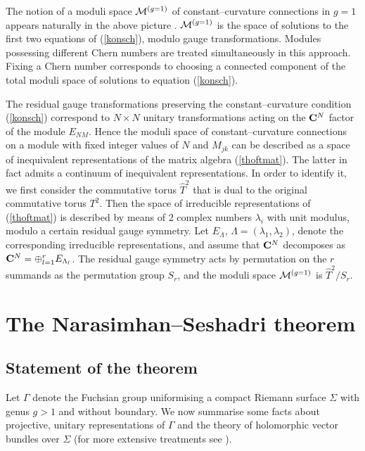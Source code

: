 \documentclass[a4paper,a4paper]{article}
\begin{document}
The notion of a moduli space ${\cal M}^{(g=1)}$ of constant--curvature 
connections in $g=1$ appears naturally in the above picture \cite{KONECHNYSCHWARZ}. 
${\cal M}^{(g=1)}$ is the space of solutions to the first two equations 
of (\ref{konsch}), modulo gauge transformations. Modules possessing different 
Chern numbers are treated simultaneously in this approach. Fixing a Chern number 
corresponds to choosing a connected component of the total moduli space of solutions 
to equation (\ref{konsch}).  
  
The residual gauge transformations preserving the constant--curvature condition  
(\ref{konsch}) correspond to $N\times N$ unitary transformations acting on the  
${\bf C}^N$ factor of the  module $E_{NM}$. Hence the moduli space of  
constant--curvature connections on a module with fixed integer values of $N$  
and $M_{jk}$ can be described as a space of inequivalent representations of  
the matrix algebra (\ref{thoftmat}). The latter in fact admits a continuum of  
inequivalent representations. In order to identify it, we first consider the  
commutative torus $\hat T^{2}$ that is dual to the original commutative torus 
$T^{2}$. Then the space of irreducible representations 
of (\ref{thoftmat}) is  described by means of $2$ complex numbers $\lambda_i$ 
with unit modulus, modulo a certain residual gauge symmetry. Let $E_{\Lambda}$, 
$\Lambda=(\lambda_1, \lambda_{2})$, denote the corresponding irreducible 
representations, and assume that ${\bf C}^N$ decomposes  
as ${\bf C}^N=\oplus_{l=1}^r E_{\Lambda_l}$. The residual gauge  
symmetry acts by permutation on the $r$ summands as the permutation group  
$S_r$, and the moduli space ${\cal M}^{(g=1)}$ is $\hat T^{2}/S_r$.  

\section{The Narasimhan--Seshadri theorem}\label{nstheorema} 
  
\subsection{Statement of the theorem}\label{useful}  
  
Let $\Gamma$ denote the Fuchsian group uniformising a compact 
Riemann surface $\Sigma$ with genus $g>1$ and without boundary. 
We now summarise some facts about projective, unitary representations 
of $\Gamma$ and the theory of holomorphic vector bundles over $\Sigma$ 
\cite{NASE} (for more extensive treatments see \cite{KOBAYASHI, ABZT}).
\end{document}
